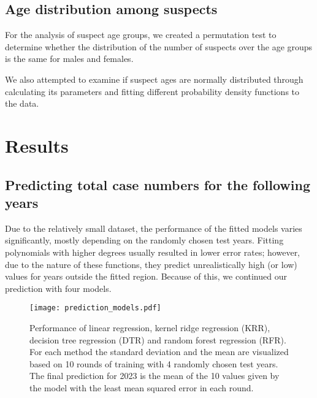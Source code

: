 \documentclass{article}
\theoremstyle{plain}
\theoremstyle{definition}
\theoremstyle{remark}
\begin{document}
\subsection{Age distribution among suspects}\label{subsec:methods_age}

For the analysis of suspect age groups, we created a permutation test to determine whether the distribution of the number of suspects over the age groups is the same for males and females. 

We also attempted to examine if suspect ages are normally distributed through calculating its parameters and fitting different probability density functions to the data.


% 

\section{Results}\label{sec:results}

\subsection{Predicting total case numbers for the following years}\label{subsec:results_pred}
Due to the relatively small dataset, the performance of the fitted models varies significantly, mostly depending on the randomly chosen test years. Fitting polynomials with higher degrees usually resulted in lower error rates; however, due to the nature of these functions, they predict unrealistically high (or low) values for years outside the fitted region. Because of this, we continued our prediction with four models.  \begin{figure}[h!]\label{fig:prediction}
    \texttt{[image: prediction\_models.pdf]}
    \caption{Performance of linear regression, kernel ridge regression (KRR), decision tree regression (DTR) and random forest regression (RFR). For each method the standard deviation and the mean are visualized based on 10 rounds of training with 4 randomly chosen test years. The final prediction for 2023 is the mean of the 10 values given by the model with the least mean squared error in each round.}
    \label{fig:enter-label}
\end{figure}
\end{document}
